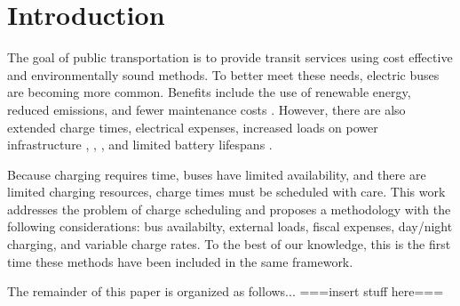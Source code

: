 \section{Introduction}
The goal of public transportation is to provide transit services using cost effective and environmentally sound methods. To better meet these needs, electric buses are becoming more common. Benefits include the use of renewable energy, reduced emissions, and fewer maintenance costs \cite{poornesh_comparative_2020}. However, there are also extended charge times, electrical expenses, increased loads on power infrastructure \cite{stahleder_impact_2019}, \cite{deb_impact_2017}, \cite{boonraksa_impact_2019}, and limited battery lifespans \cite{houbbadi_optimal_2019}.  
\par Because charging requires time, buses have limited availability, and there are limited charging resources, charge times must be scheduled with care. This work addresses the problem of charge scheduling and proposes a methodology with the following considerations: bus availabilty, external loads, fiscal expenses, day/night charging, and variable charge rates. To the best of our knowledge, this is the first time these methods have been included in the same framework. 
\par The remainder of this paper is organized as follows... ===insert stuff here===

